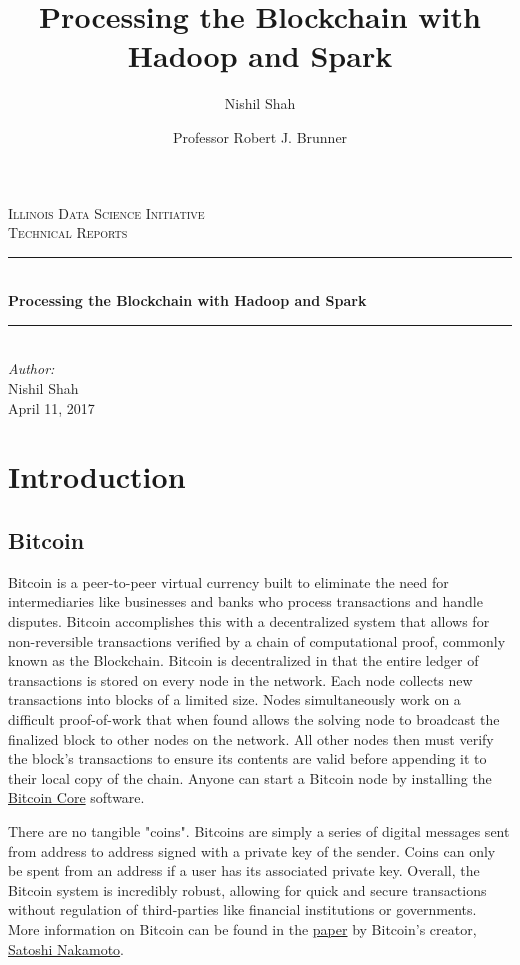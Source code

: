 \documentclass[9pt,twocolumn,twoside]{idsi}
\author[1,3]{Nishil Shah}
\author[2,3]{Professor Robert J. Brunner}
\affil[1]{National Center For Supercomputing Applications (NCSA)}
\affil[2]{Laboratory for Computation, Data, and Machine Learning}
\affil[3]{Illinois Data Science Initiative}
\title{Processing the Blockchain with Hadoop and Spark}
\newcommand{\HRule}{\rule{\linewidth}{0.5mm}}
\begin{document}
\begin{titlepage}
\center
\textsc{\LARGE Illinois Data Science Initiative}\\[1.5cm]
\textsc{\Large Technical Reports}\\[0.5cm] \HRule \\[0.4cm]
{\huge \bfseries Processing the Blockchain with Hadoop and Spark } \\[0.4cm] \HRule \\[1.5cm]
\Large \emph{Author:}\\ Nishil Shah \\[3cm]
{\large April 11, 2017}\\[3cm] %
\vfill
\end{titlepage}
%

\maketitle

\section{Introduction}
\subsection{Bitcoin}
Bitcoin is a peer-to-peer virtual currency built to eliminate the need for intermediaries like businesses and banks who process transactions and handle disputes. Bitcoin accomplishes this with a decentralized system that allows for non-reversible transactions verified by a chain of computational proof, commonly known as the Blockchain. Bitcoin is decentralized in that the entire ledger of transactions is stored on every node in the network. Each node collects new transactions into blocks of a limited size. Nodes simultaneously work on a difficult proof-of-work that when found allows the solving node to broadcast the finalized block to other nodes on the network. All other nodes then must verify the block's transactions to ensure its contents are valid before appending it to their local copy of the chain. Anyone can start a Bitcoin node by installing the \href{https://bitcoin.org/en/bitcoin-core/}{Bitcoin Core} software.

There are no tangible "coins". Bitcoins are simply a series of digital messages sent from address to address signed with a private key of the sender. Coins can only be spent from an address if a user has its associated private key. Overall, the Bitcoin system is incredibly robust, allowing for quick and secure transactions without regulation of third-parties like financial institutions or governments. More information on Bitcoin can be found in the \href{https://bitcoin.org/bitcoin.pdf}{paper} by Bitcoin's creator, \href{https://en.wikipedia.org/wiki/Satoshi_Nakamoto}{Satoshi Nakamoto}.
\end{document}
